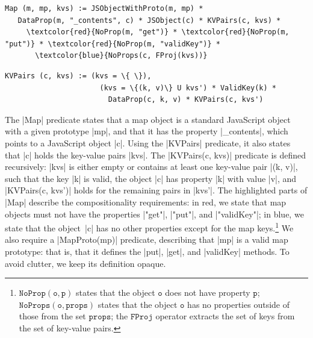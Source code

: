 
\smallskip
\begin{Verbatim}[fontsize=\footnotesize,commandchars=\\\{\}]
 Map (m, mp, kvs) := JSObjectWithProto(m, mp) * 
   DataProp(m, "_contents", c) * JSObject(c) * KVPairs(c, kvs) * 
     \textcolor{red}{NoProp(m, "get")} * \textcolor{red}{NoProp(m, "put")} * \textcolor{red}{NoProp(m, "validKey")} * 
       \textcolor{blue}{NoProps(c, FProj(kvs))}
\end{Verbatim}
\begin{Verbatim}[fontsize=\footnotesize,commandchars=\\\{\}]
  KVPairs (c, kvs) := (kvs = \{ \}),
                      (kvs = \{(k, v)\} U kvs') * ValidKey(k) * 
                        DataProp(c, k, v) * KVPairs(c, kvs')
\end{Verbatim}

\smallskip
The \jsinline|Map| predicate states that a map object is a standard JavaScript object with a given prototype \jsinline|mp|, and that it has the property \jsinline|_contents|, which points to a  JavaScript object \jsinline|c|.
Using the \jsinline|KVPairs| predicate, %
it also states that \jsinline|c| holds the key-value pairs \jsinline|kvs|. 
The \jsinline|KVPairs(c, kvs)| predicate is defined recursively: \jsinline|kvs| is either empty or contains at least one key-value pair \jsinline|(k, v)|, 
such that the key \jsinline|k| is  valid, the object \jsinline|c| has
property \jsinline|k| with value \jsinline|v|, and
\jsinline|KVPairs(c, kvs')| holds for the remaining pairs in \jsinline|kvs'|.
The highlighted parts of \jsinline|Map| describe the compositionality requirements: in red, we state that map objects must not have the properties \jsinline|"get"|, \jsinline|"put"|, and \jsinline|"validKey"|; in blue, we state that the object~\jsinline|c| has no other properties except for the map keys.\footnote{$\mathtt{NoProp(o, p)}$  states that the object $\mathtt{o}$ does not have property $\mathtt{p}$; $\mathtt{NoProps(o, props)}$ states that the object $\mathtt{o}$ has no properties outside of those from the set $\mathtt{props}$; the $\mathtt{FProj}$ operator extracts the set of keys from the set of key-value pairs.}
%
We also require a \jsinline|MapProto(mp)| predicate, describing that
\jsinline|mp| is a valid map prototype:  that is, that   it defines the \jsinline|put|, \jsinline|get|, and \jsinline|validKey| methods. To avoid clutter, we keep its definition opaque.

